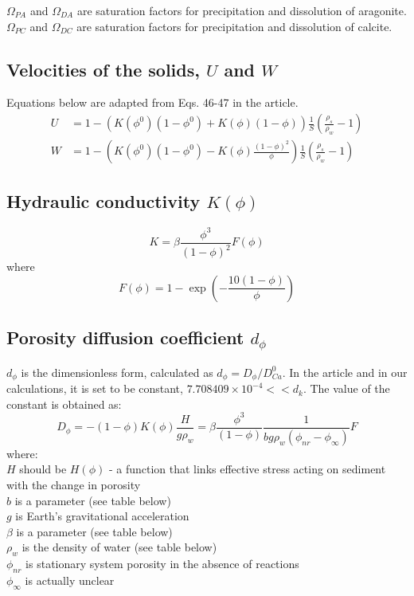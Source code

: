 \documentclass[10pt, letterpaper]{article}
\begin{document}
$\Omega_{PA}$ and $\Omega_{DA}$ are saturation factors for precipitation and dissolution of aragonite. $\Omega_{PC}$ and $\Omega_{DC}$ are saturation factors for precipitation and dissolution of calcite.

\subsection{Velocities of the solids, $U$ and $W$}
Equations below are adapted from Eqs. 46-47 in the article.
\begin{equation}
\begin{align}
    U &= 1 - \left(K(\phi^0)(1-\phi^0) + K(\phi)(1-\phi)\right) \frac{1}{S}\left(\frac{\rho_s}{\rho_w}-1\right) \nonumber \\
    W &= 1 - \left(K(\phi^0)(1-\phi^0) - K(\phi) \frac{(1-\phi)^2}{\phi}\right)\frac{1}{S}\left(\frac{\rho_s}{\rho_w}-1\right) \nonumber
\end{align}
\end{equation}

\subsection{Hydraulic conductivity $K(\phi)$}

\begin{equation}
    K = \beta \frac{\phi^3}{(1 - \phi)^2}F(\phi) \tag{15}
\end{equation}
where
\begin{equation}
    F(\phi) = 1 - \exp\left( -\frac{10(1-\phi)}{\phi} \right) \tag{17}
\end{equation}

\subsection{Porosity diffusion coefficient $d_{\phi}$}
$d_{\phi}$ is the dimensionless form, calculated as $d_{\phi} = D_{\phi}/D_{Ca}^0$. 
In the article and in our calculations, it is set to be constant, $7.708409\times10^{-4} << d_k$. The value of the constant is obtained as:
\begin{equation}
    D_{\phi} = -\left(1 - \phi\right)K(\phi)\frac{H}{g\rho_w} = \beta\frac{\phi^3}{(1 - \phi)}\frac{1}{bg\rho_w(\phi_{nr}-\phi_{\infty})}F \tag{25}
\end{equation}
where:\\
$H$ should be $H(\phi)$ - a function that links effective stress acting on sediment with the change in porosity\\
$b$ is a parameter (see table below)\\
$g$ is Earth's gravitational acceleration\\
$\beta$ is a parameter (see table below)\\
$\rho_w$ is the density of water (see table below)\\
$\phi_{nr}$ is stationary system porosity in the absence of reactions\\
$\phi_{\infty}$ is actually unclear
\end{document}
